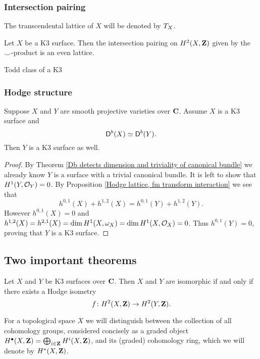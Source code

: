 \subsubsection{Intersection pairing}

The transcendental lattice of $X$ will be denoted by $T_{X}$.

\begin{proposition}
    \label{intersection pairing on K3 is even}
    Let $X$ be a K3 surface. Then the intersection pairing on $H^2(X, \mathbf Z)$ given by the $\smallsmile$-product is an even lattice. 
\end{proposition}

\begin{proposition}
    \label{Todd class of K3}
    Todd class of a K3
\end{proposition}

\begin{example}
    
\end{example}

\subsubsection{Hodge structure}

\begin{theorem}
    Suppose $X$ and $Y$ are smooth projective varieties over $\mathbf C$. Assume $X$ is a K3 surface and
    \[
        \mathsf{D}^b(X) \simeq \mathsf{D}^b(Y).
    \]
    Then $Y$ is a K3 surface as well. 
\end{theorem}

\begin{proof}
    By Theorem \ref{Db detects dimension and triviality of canonical bundle} we already know $Y$ is a surface with a trivial canonical bundle. It is left to show that $H^{1}(Y, {\mathcal{O}_{Y}}) = 0$. By Proposition \ref{Hodge lattice, fm transform interaction} we see that 
    \[
        h^{0,1}(X) + h^{1,2}(X) = h^{0,1}(Y) + h^{1,2}(Y). 
    \]
    However $h^{0,1}(X) = 0$ and $h^{1,2}(X) = h^{2,1}(X) = \dim H^{1}(X, \omega_X) = \dim H^{1}(X, {\mathcal{O}_{X}}) = 0$. Thus $h^{0,1}(Y) = 0$, proving that $Y$ is a K3 surface.
\end{proof}

\subsection{Two important theorems}

\begin{theorem}[Torelli]
    \label{Classical Torelli theorem}
    Let $X$ and $Y$ be K3 surfaces over $\mathbf C$. Then $X$ and $Y$ are isomorphic if and only if there exists a Hodge isometry
    \[
        f\colon H^{2}(X, \mathbf Z) \to H^{2}(Y, \mathbf Z).
    \]
\end{theorem}

\begin{remark}
    For a topological space $X$ we will distinguish between the collection of all cohomology groups, considered concisely as a graded object $H^{\bullet}(X, \mathbf Z) = \bigoplus_{i\in \mathbf Z} H^{i}(X, \mathbf Z)$, and its (graded) cohomology ring, which we will denote by $H^{*}(X, \mathbf Z)$.
\end{remark}